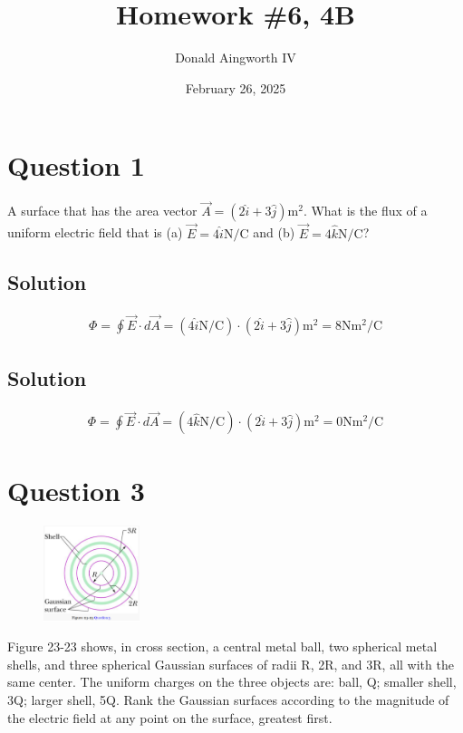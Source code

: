 \documentclass[12pt]{article}
\title{Homework \#6, 4B}
\author{Donald Aingworth IV}
\date{February 26, 2025}
\begin{document}

\maketitle

\section{Question 1}
A surface that has the area vector $\vec{A} = \left(2\hat{i} + 3\hat{j}\right) \unit{\meter^2}$. What is the flux of a uniform electric field that is (a) $\vec{E} = 4\hat{i} \unit{\newton/\coulomb}$ and (b) $\vec{E} = 4\hat{k} \unit{\newton/\coulomb}$?

\subsection{Solution}
\begin{gather*}
    \Phi = \oint \vec{E} \cdot d\vec{A}
        =   \left(4\hat{i} \unit{\newton/\coulomb}\right) \cdot \left(2\hat{i} + 3\hat{j}\right) \unit{\meter^2}
        =   \boxed{8 \unit{\newton\meter^2/\coulomb}}
\end{gather*}

\subsection{Solution}
\begin{gather*}
    \Phi = \oint \vec{E} \cdot d\vec{A}
        =   \left(4\hat{k} \unit{\newton/\coulomb}\right) \cdot \left(2\hat{i} + 3\hat{j}\right) \unit{\meter^2}
        =   \boxed{0 \unit{\newton\meter^2/\coulomb}}
\end{gather*}

\pagebreak
\section{Question 3}
\begin{figure}
    \vspace{-30pt}
    \includegraphics[width=0.25\textwidth]{picture_2.png} 
\end{figure}
Figure 23-23 shows, in cross section, a central metal ball, two spherical metal shells, and three spherical Gaussian surfaces of radii R, 2R, and 3R, all with the same center. The uniform charges on the three objects are: ball, Q; smaller shell, 3Q; larger shell, 5Q. Rank the Gaussian surfaces according to the magnitude of the electric field at any point on the surface, greatest first.
\end{document}
